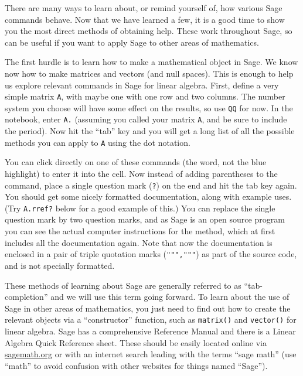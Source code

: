 There are many ways to learn about, or remind yourself of, how various Sage commands behave.  Now that we have learned a few, it is a good time to show you the most direct methods of obtaining help.  These work throughout Sage, so can be useful if you want to apply Sage to other areas of mathematics.\par
%
The first hurdle is to learn how to make a mathematical object in Sage.  We know now how to make matrices and vectors (and null spaces).  This is enough to help us explore relevant commands in Sage for linear algebra.  First, define a very simple matrix \verb?A?, with maybe one with one row and two columns.  The number system you choose will have some effect on the results, so use \verb?QQ? for now.  In the notebook, enter \verb?A.? (assuming you called your matrix \verb?A?, and be sure to include the period).  Now hit the ``tab'' key and you will get a long list of all the possible methods you can apply to \verb?A? using the dot notation.\par
%
You can click directly on one of these commands (the word, not the blue highlight) to enter it into the cell.  Now instead of adding parentheses to the command, place a single question mark (\verb!?!) on the end and hit the tab key again.  You should get some nicely formatted documentation, along with example uses.  (Try \verb!A.rref?! below for a good example of this.)  You can replace the single question mark by two question marks, and as Sage is an open source program you can see the actual computer instructions for the method, which at first includes all the documentation again.  Note that now the documentation is enclosed in a pair of triple quotation marks (\verb?""","""?) as part of the source code, and is not specially formatted.\par
%
These methods of learning about Sage are generally referred to as ``tab-completion'' and we will use this term going forward.  To learn about the use of Sage in other areas of mathematics, you just need to find out how to create the relevant objects via a ``constructor'' function, such as \verb?matrix()? and \verb?vector()? for linear algebra.
%
Sage has a comprehensive Reference Manual and there is a Linear Algebra Quick Reference sheet.  These should be easily located online via \url{sagemath.org} or with an internet search leading with the terms ``sage math'' (use ``math'' to avoid confusion with other websites for things named ``Sage'').
%
\begin{sageverbatim}
\end{sageverbatim}
%
